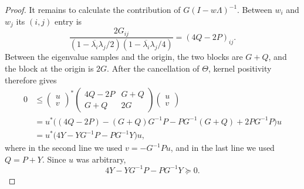 \documentclass{aomart}
\theoremstyle{definition}
\begin{document}
\begin{proof}
It remains to calculate the contribution of
$G(I-w\Lambda)^{-1}$.  Between $w_i$ and $w_j$ its $(i,j)$ entry is
\begin{equation}
  \frac{2G_{ij}}
  {(1-\overline{\lambda_i}\lambda_j/2)
   (1-\overline{\lambda_i}\lambda_j/4)}
  =(4Q-2P)_{ij}.
  \label{eq:sampled-main-block}
\end{equation}
Between the eigenvalue samples and the origin, the two blocks are
$G+Q$, and the block at the origin is $2G$.  After the cancellation of
$\Theta$, kernel positivity therefore gives
\begin{equation}
\begin{aligned}
0&\leq
\begin{pmatrix}u\\v\end{pmatrix}^{\!*}
\begin{pmatrix}
  4Q-2P&G+Q\\
  G+Q&2G
\end{pmatrix}
\begin{pmatrix}u\\v\end{pmatrix}\\
&=u^*\bigl((4Q-2P)-(G+Q)G^{-1}P
-PG^{-1}(G+Q)+2PG^{-1}P\bigr)u\\
&=u^*\bigl(4Y-YG^{-1}P-PG^{-1}Y\bigr)u,
\end{aligned}
\label{eq:pre-gramian-inequality}
\end{equation}
where in the second line we used $v=-G^{-1}Pu$, and in the last line
we used $Q=P+Y$.
Since $u$ was arbitrary,
\begin{equation}
  4Y-YG^{-1}P-PG^{-1}Y\succeq0.
  \label{eq:Y-inequality}
\end{equation}


\end{proof}
\end{document}
